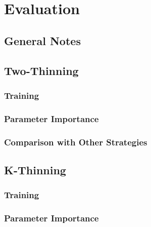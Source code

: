 \chapter{Evaluation}\label{evaluation}


\ifpdf
    \graphicspath{{Chapter3/Figs/Raster/}{Chapter3/Figs/PDF/}{Chapter3/Figs/}}
\else
    \graphicspath{{Chapter3/Figs/Vector/}{Chapter3/Figs/}}
\fi




\section{General Notes}


\section{Two-Thinning}



\subsection{Training}


\subsection{Parameter Importance}


\subsection{Comparison with Other Strategies}



\section{K-Thinning}


\subsection{Training}


\subsection{Parameter Importance}


